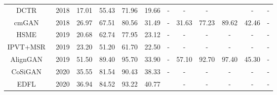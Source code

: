\documentclass[journal]{IEEEtran}
\begin{document}
\begin{table*}[]
\begin{tabular}{c|c|ccccc|ccccc}
		DCTR~\cite{ye2018visible}                     & 2018                  & 17.01                       & 55.43                        & 71.96                        & 19.66                    & -              & -                           & -                            &                              & -                        & -              \\
		cmGAN~\cite{dai2018cross}                    & 2018                  & 26.97                       & 67.51                        & 80.56                        & 31.49                    & -              & 31.63                       & 77.23                        & 89.62                        & 42.46                    & -              \\ \hline
		HSME~\cite{hao2019hsme}                     & 2019                  & 20.68                       & 62.74                        & 77.95                        & 23.12                    & -              & -                           & -                            & -                            & -                        & -              \\
		IPVT+MSR~\cite{kang2019person}                 & 2019                  & 23.20                       & 51.20                        & 61.70                        & 22.50                    & -              & -                           & -                            & -                            & -                        & -              \\
		AlignGAN~\cite{wang2019rgb}                 & 2019                  & 51.50                       & 89.40                        & 95.70                        & 33.90                    & -              & 57.10                       & 92.70                        & 97.40                        & 45.30                    & -              \\ \hline
		CoSiGAN~\cite{zhong2020visible}                  & 2020                  & 35.55                       & 81.54                        & 90.43                        & 38.33                    & -              & -                           & -                            & -                            & -                        & -              \\
		EDFL~\cite{liu2020enhancing}                     & 2020                  & 36.94                       & 84.52                        & 93.22                        & 40.77                    &                & -                           & -                            & -                            & -                        & -              \\

\end{tabular}
\end{table*}
\end{document}
